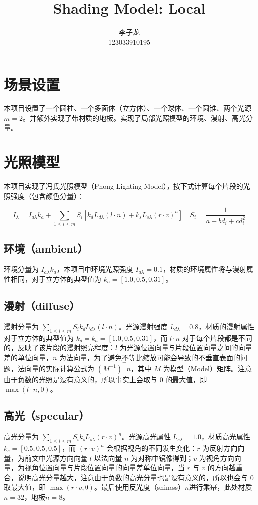 \documentclass[math-font=newcm]{sjtuarticle}
\title{Shading Model: Local}
\author{李子龙\\123033910195}
\begin{document}
\maketitle

\tableofcontents*
\clearpage

\section{场景设置}

本项目设置了一个圆柱、一个多面体（立方体）、一个球体、一个圆锥、两个光源$m=2$。并额外实现了带材质的地板。实现了局部光照模型的环境、漫射、高光分量。

\section{光照模型}

本项目实现了冯氏光照模型（Phong Lighting Model），按下式计算每个片段的光照强度（包含颜色分量）：

\begin{equation}\label{eq:phong}
    I_\lambda=I_{a\lambda}k_a+\sum_{1\leq i\leq m}S_i[k_dL_{d\lambda}(l\cdot n)+k_sL_{s\lambda}(r\cdot v)^n]\quad S_i=\frac{1}{a+bd_i+cd_i^2}
\end{equation}

\subsection{环境（ambient）}

环境分量为 $I_{a\lambda}k_a$，本项目中环境光照强度 $I_{a\lambda}=0.1$，材质的环境属性将与漫射属性相同，对于立方体的典型值为 $k_a=[1.0, 0.5, 0.31]$。

\subsection{漫射（diffuse）}
漫射分量为 $\sum_{1\leq i\leq m}S_ik_dL_{d\lambda}(l\cdot n)$。光源漫射强度 $L_{d\lambda}=0.8$，材质的漫射属性对于立方体的典型值为 $k_d=k_a=[1.0, 0.5, 0.31]$，而 $l\cdot n$ 对于每个片段都是不同的，反映了该片段的漫射照亮程度：$l$ 为光源位置向量与片段位置向量之间的向量差的单位向量，$n$ 为法向量，为了避免不等比缩放可能会导致的不垂直表面的问题\cite{normal}，法向量的实际计算公式为 $(M^{-1})^\top n$，其中 $M$ 为模型（Model）矩阵。注意由于负数的光照是没有意义的，所以事实上会取与 0 的最大值，即 $\max(l\cdot n, 0)$。

\subsection{高光（specular）}
高光分量为 $\sum_{1\leq i\leq m}S_ik_sL_{s\lambda}(r\cdot v)^n$。光源高光属性 $L_{s\lambda}=1.0$，材质高光属性 $k_s=[0.5,0.5,0.5]$，而 $(r\cdot v)^n$ 会根据视角的不同发生变化：$r$ 为反射方向向量，为前文中光源方向向量 $l$ 以法向量 $n$ 为对称中镜像得到；$v$ 为视角方向向量，为视角位置向量与片段位置向量的向量差单位向量，当 $r$ 与 $v$ 的方向越重合，说明高光分量越大，注意由于负数的高光分量也是没有意义的，所以也会与 0 取最大值，即 $\max(r\cdot v,0)$。最后使用反光度（shiness）$n$进行乘幂，此处材质 $n=32$，地板$n=8$。
\end{document}
